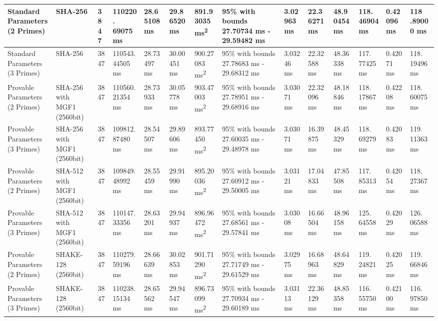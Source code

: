 \documentclass[]{final_report}
\theoremstyle{definition}
\begin{document}
\begin{landscape}
\begin{longtable}{|p{2.3cm}|p{1.8cm}|p{1.0cm}|p{1.7cm}|p{1.4cm}|p{1.5cm}|p{1.8cm}|p{1.5cm}|p{1.2cm}|p{1.5cm}|p{1.3cm}|p{1.2cm}|p{1.3cm}|p{1.3cm}|}
\hline
\endlastfoot
Standard Parameters (2 Primes) & SHA-256 & 3847 & 110220.
69075 ms & 28.65108 ms & 29.86520 ms & 891.93035 ms\textsuperscript{2} & 95\% with bounds 27.70734 ms - 29.59482 ms & 3.02963 ms & 22.36271 ms & 48.90454 ms & 118.
46904 ms & 0.42096 ms & 118
.89000 ms \\
\hline
Standard Parameters (3 Primes) & SHA-256 & 3847 & 110543.
44505 ms & 28.73497 ms & 30.00451 ms & 900.27083 ms\textsuperscript{2} & 95\% with bounds 27.78683 ms - 29.68312 ms & 3.03246 ms & 22.32588 ms & 48.36338 ms & 117.
77425 ms & 0.42071 ms & 118.
19496 ms  \\
\hline
Provable Parameters (2 Primes) & SHA-256 with MGF1 (2560bit) & 3847 & 110560.
21354 ms & 28.73933 ms & 30.05778 ms & 903.47003 ms\textsuperscript{2} & 95\% with bounds 27.78951 ms - 29.68916 ms & 3.03071 ms & 22.32096 ms & 48.18846 ms & 118.
17867 ms & 0.42208 ms & 118.
60075 ms  \\
\hline
Provable Parameters (3 Primes) & SHA-256 with MGF1 (2560bit) & 3847 & 109812.
87480 ms & 28.54507 ms & 29.89606 ms & 893.77450 ms\textsuperscript{2} & 95\% with bounds 27.60035 ms - 29.48978 ms & 3.03071 ms & 16.39875 ms & 48.45329 ms & 118.
69279 ms & 0.42083 ms & 119.
11363 ms  \\
\hline
Provable Parameters (2 Primes) & SHA-512 with MGF1 (2560bit) & 3847 & 109849.
48992 ms & 28.55459 ms & 29.91990 ms & 895.20036 ms\textsuperscript{2} & 95\% with bounds 27.60912 ms - 29.50005 ms & 3.03121 ms & 17.04833 ms & 47.85508 ms & 117.
85313 ms & 0.42054 ms & 118.
27367 ms  \\
\hline
Provable Parameters (3 Primes) & SHA-512 with MGF1 (2560bit) & 3847 & 110147.
33356 ms & 28.63201 ms & 29.94937 ms & 896.96472 ms\textsuperscript{2} & 95\% with bounds 27.68561 ms - 29.57841 ms & 3.03008 ms & 16.66504 ms & 48.96158 ms & 125.
64558 ms & 0.42029 ms & 126.
06588 ms  \\
\hline
Provable Parameters (2 Primes) & SHAKE-128 (2560bit) & 3847 & 110279.
59196 ms & 28.66639 ms & 30.02853 ms & 901.71290 ms\textsuperscript{2} & 95\% with bounds 27.71749 ms - 29.61529 ms & 3.02975 ms & 16.68963 ms & 48.64829 ms & 119.
24821 ms & 0.42025 ms & 119.
66846 ms  \\
\hline
Provable Parameters (3 Primes) & SHAKE-128 (2560bit) & 3847 & 110238.
15134 ms & 28.65562 ms & 29.94547 ms & 896.73099 ms\textsuperscript{2} & 95\% with bounds 27.70934 ms - 29.60189 ms & 3.03113 ms & 22.36129 ms & 48.85358 ms & 116.
55750 ms & 0.42100 ms & 116.
97850 ms \\

\end{longtable}
\end{landscape}
\end{document}

